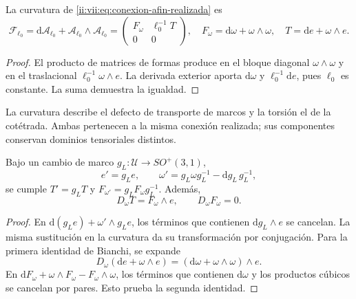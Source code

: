 \begin{proposition}
\label{ii:vii:prop:curvatura-afin}
La curvatura de \eqref{ii:vii:eq:conexion-afin-realizada} es
\begin{equation}
 \mathcal F_{\ell_0}
 =\mathrm d\mathcal A_{\ell_0}
   +\mathcal A_{\ell_0}\wedge\mathcal A_{\ell_0}
 =\begin{pmatrix}F_\omega&\ell_0^{-1}T\\0&0\end{pmatrix},
 \quad F_\omega=\mathrm d\omega+\omega\wedge\omega,
 \quad T=\mathrm de+\omega\wedge e.
 \label{ii:vii:eq:curvatura-afin-realizada}
\end{equation}
\end{proposition}
\begin{proof}
El producto de matrices de formas produce en el bloque diagonal
\(\omega\wedge\omega\) y en el traslacional
\(\ell_0^{-1}\omega\wedge e\). La derivada exterior aporta
\(\mathrm d\omega\) y \(\ell_0^{-1}\mathrm de\), pues
\(\ell_0\) es constante. La suma demuestra la igualdad.
\end{proof}

La curvatura describe el defecto de transporte de marcos y la torsión
el de la cotétrada. Ambas pertenecen a la misma conexión realizada;
sus componentes conservan dominios tensoriales distintos.

\begin{proposition}
\label{ii:vii:prop:bianchi-cartan}
Bajo un cambio de marco \(g_L:\mathcal U\to SO^+(3,1)\),
\[
 e'=g_Le,\qquad
 \omega'=g_L\omega g_L^{-1}-\mathrm dg_L\,g_L^{-1},
\]
se cumple \(T'=g_LT\) y \(F_{\omega'}=g_LF_\omega g_L^{-1}\).
Además,
\begin{equation}
 D_\omega T=F_\omega\wedge e,\qquad D_\omega F_\omega=0.
 \label{ii:vii:eq:bianchi-realizacion}
\end{equation}
\end{proposition}
\begin{proof}
En \(\mathrm d(g_Le)+\omega'\wedge g_Le\), los términos
que contienen \(\mathrm dg_L\wedge e\) se cancelan.
La misma sustitución en la curvatura da su transformación por
conjugación. Para la primera identidad de Bianchi, se expande
\[
 D_\omega(\mathrm de+\omega\wedge e)
 =(\mathrm d\omega+\omega\wedge\omega)\wedge e.
\]
En \(\mathrm dF_\omega+\omega\wedge F_\omega-F_\omega\wedge\omega\),
los términos que contienen \(\mathrm d\omega\) y los productos
cúbicos se cancelan por pares. Esto prueba la segunda identidad.
\end{proof}


